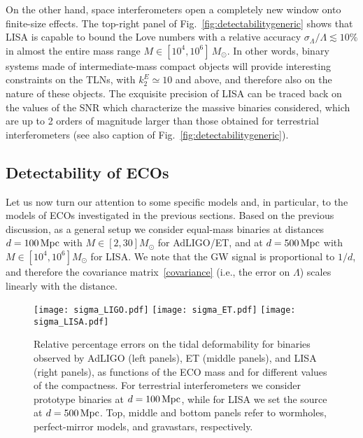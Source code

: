 \documentclass[aps,twocolumn,showpacs,preprintnumbers,nofootinbib,prd,superscriptaddress,groupedaddress,10pt]{revtex4-1}
\begin{document}
On the other hand, space interferometers open a completely new window onto finite-size effects. The top-right  panel of Fig.~\ref{fig:detectabilitygeneric} shows that  LISA is capable to 
bound the Love numbers with a relative accuracy $\sigma_\Lambda/\Lambda\lesssim 10\%$ in almost the entire mass range $M\in[10^4,10^6]\,M_\odot$. In other words, binary systems made of 
intermediate-mass compact objects will provide interesting constraints on the TLNs, with 
$k_2^E\simeq10$ and above, and therefore also on the nature of these objects. The exquisite precision 
of LISA can be traced back on the values of the SNR which characterize the massive binaries considered, 
which are up to 2 orders of magnitude larger than those obtained for terrestrial interferometers 
(see also caption of Fig.~\ref{fig:detectabilitygeneric}).  



\subsection{Detectability of ECOs}

Let us now turn our attention to some specific models and, in particular, to the models of ECOs investigated in the previous sections. 
Based on the previous discussion, as a general setup we consider equal-mass binaries at 
distances $d=100\,{\rm Mpc}$ with $M\in[2,30]M_{\odot}$ for AdLIGO/ET, and at $d=500\,{\rm Mpc}$ with $M\in[10^4,10^6]M_{\odot}$ 
for LISA. We note that the GW signal is proportional to $1/d$, and therefore the covariance 
matrix~\eqref{covariance} (i.e., the error on $\Lambda$) scales linearly with the distance. 


%
\begin{figure*}[th]
\centering
\texttt{[image: sigma\_LIGO.pdf]}
\texttt{[image: sigma\_ET.pdf]}
\texttt{[image: sigma\_LISA.pdf]}
\caption{Relative percentage errors on the tidal deformability for binaries observed by AdLIGO (left panels), 
ET (middle panels), and LISA (right panels), as functions of the ECO mass and for different values of the compactness. For terrestrial 
interferometers we consider prototype binaries at $d=100\,{\rm Mpc}$, while for LISA we set the source at $d=500\,{\rm Mpc}$.
Top, middle and bottom panels refer to wormholes, perfect-mirror models, and gravastars, respectively.
}
\label{fig:detectability}
\end{figure*}
%
\end{document}
